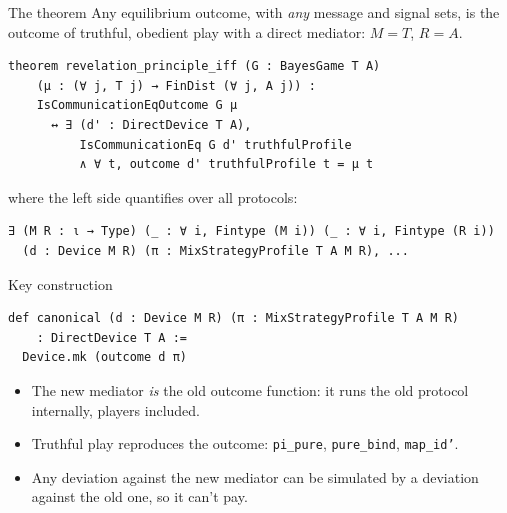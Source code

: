 \documentclass{beamer}
\newcommand{\muted}[1]{{\color{dimgray}#1}}
\begin{document}
\begin{frame}[fragile]{The theorem}
  Any equilibrium outcome, with \emph{any} message and signal sets, is the outcome of
  \alert{truthful, obedient} play with a \alert{direct} mediator: $M = T$, $R = A$.

  \vspace{0.6em}
\begin{verbatim}
theorem revelation_principle_iff (G : BayesGame T A)
    (μ : (∀ j, T j) → FinDist (∀ j, A j)) :
    IsCommunicationEqOutcome G μ
      ↔ ∃ (d' : DirectDevice T A),
          IsCommunicationEq G d' truthfulProfile
          ∧ ∀ t, outcome d' truthfulProfile t = μ t
\end{verbatim}

  \vspace{0.2em}
  \muted{where the left side quantifies over all protocols:}
\begin{verbatim}
∃ (M R : ι → Type) (_ : ∀ i, Fintype (M i)) (_ : ∀ i, Fintype (R i))
  (d : Device M R) (π : MixStrategyProfile T A M R), ...
\end{verbatim}
\end{frame}

\begin{frame}[fragile]{Key construction}
  \vspace{0.8em}
\begin{verbatim}
def canonical (d : Device M R) (π : MixStrategyProfile T A M R)
    : DirectDevice T A :=
  Device.mk (outcome d π)
\end{verbatim}

  \vspace{1.2em}
  \begin{itemize}\setlength\itemsep{0.7em}
    \item The new mediator \emph{is} the old outcome function: it runs the old protocol internally, players included.
    \item Truthful play reproduces the outcome: \texttt{pi\_pure}, \texttt{pure\_bind}, \texttt{map\_id'}.
    \item Any deviation against the new mediator can be \alert{simulated} by a deviation against the old one, so it can't pay.
  \end{itemize}
\end{frame}
\end{document}
